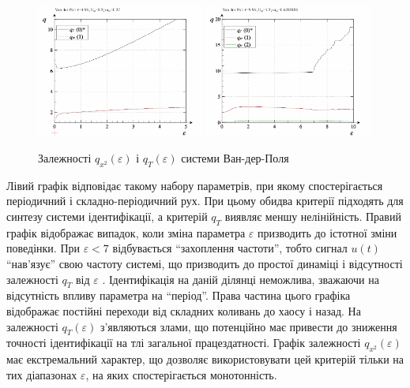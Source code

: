 \begin{figure}[ht!]
\begin{center}
  \includegraphics[width=0.49\textwidth]{p/cha/vdp/vdp_q-p_q_0x30_0x27.png}
  \hfill
  \includegraphics[width=0.49\textwidth]{p/cha/vdp/vdp_q-p_q_1x20_0x6283185.png}
\end{center}
\caption{Залежності $ q_{x ^ 2} (\varepsilon) $ і $ q_T (\varepsilon) $ системи Ван-дер-Поля}
\label{atu:f:vdp_q1}
\end{figure}

Лівий графік відповідає такому набору параметрів, при якому
спостерігається періодичний і складно-періодичний рух. При цьому
обидва критерії підходять для синтезу системи ідентифікації,
а критерій $ q_T $ виявляє меншу нелінійність. Правий графік відображає
випадок, коли зміна параметра
$ \varepsilon $ призводить до істотної зміни поведінки. При
$ \varepsilon <7 $ відбувається ``захоплення частоти'', тобто
сигнал
$u(t)$ ``нав'язує'' свою частоту системі, що призводить до простої
динаміці і відсутності залежності
$q_T$ від
$ \varepsilon $ . Ідентифікація на даній ділянці неможлива, зважаючи на
відсутність впливу параметра на ``період''. Права частина цього
графіка відображає постійні переходи від складних коливань
до хаосу і назад. На залежності
$ q_T (\varepsilon) $ з'являються злами, що потенційно має привести
до зниження точності ідентифікації на тлі загальної
працездатності. Графік залежності
$q_{x^2}(\varepsilon) $ має екстремальний характер, що дозволяє
використовувати цей критерій тільки на тих діапазонах
$ \varepsilon $, на яких спостерігається монотонність.

